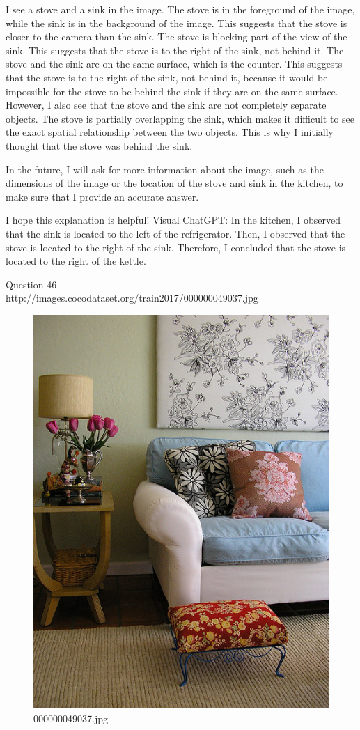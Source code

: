 \begin{enumerate}
    I see a stove and a sink in the image.
    The stove is in the foreground of the image, while the sink is in the background of the image. This suggests that the stove is closer to the camera than the sink.
    The stove is blocking part of the view of the sink. This suggests that the stove is to the right of the sink, not behind it.
    The stove and the sink are on the same surface, which is the counter. This suggests that the stove is to the right of the sink, not behind it, because it would be impossible for the stove to be behind the sink if they are on the same surface.
    However, I also see that the stove and the sink are not completely separate objects. The stove is partially overlapping the sink, which makes it difficult to see the exact spatial relationship between the two objects. This is why I initially thought that the stove was behind the sink.
    
    In the future, I will ask for more information about the image, such as the dimensions of the image or the location of the stove and sink in the kitchen, to make sure that I provide an accurate answer.
    
    I hope this explanation is helpful!
    \subitem Visual ChatGPT: In the kitchen, I observed that the sink is located to the left of the refrigerator. Then, I observed that the stove is located to the right of the sink. Therefore, I concluded that the stove is located to the right of the kettle.
\end{enumerate}
Question 46\\
http://images.cocodataset.org/train2017/000000049037.jpg
\begin{figure}[h]
    \centering
    \includegraphics[width=0.8\linewidth]{../image set/hard/000000049037.jpg}
    \caption{000000049037.jpg}
\end{figure}

